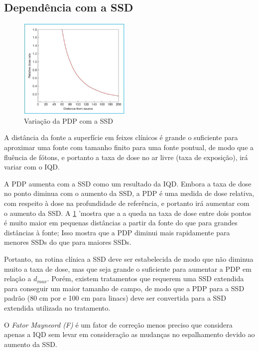 \documentclass[11pt,a4paper]{article}
\begin{document}
	\subsection{Dependência com a SSD}

	\begin{figure}
		\centering
		\includegraphics[width=0.48\textwidth]{Imagens/pdpSsd.JPG}
		\caption{Variação da PDP com a SSD}
		\label{fig:pdpSsd}
	\end{figure}

	A distância da fonte a superfície em feixes clínicos é grande o suficiente para aproximar uma fonte com tamanho finito para uma fonte pontual, de modo que a fluência de fótons, e portanto a taxa de dose no ar livre (taxa de exposição), irá variar com o IQD. 

	A PDP aumenta com a SSD como um resultado da IQD. Embora a taxa de dose no ponto diminua com o aumento da SSD, a PDP é uma medida de dose relativa, com respeito à dose na profundidade de referência, e portanto irá aumentar com o aumento da SSD. A \ref{fig:pdpSsd} 'mostra que a a queda na taxa de dose entre dois pontos é muito maior em pequenas distâncias a partir da fonte do que para grandes distâncias à fonte; Isso mostra que a PDP diminui mais rapidamente para menores SSDs do que para maiores SSDs. 

	Portanto, na rotina clínica a SSD deve ser estabelecida de modo que não diminua muito a taxa de dose, mas que seja grande o suficiente para aumentar a PDP em relação a $d_{max}$. Porém, existem tratamentos que requerem uma SSD extendida para conseguir um maior tamanho de campo, de modo que a PDP para a SSD padrão (80 cm por  e 100 cm para linacs) deve ser convertida para a SSD extendida utilizada no tratamento. 

	O \textit{\textcolor{CarnationPink}{Fator Mayneord (F)}} é um fator de correção menos preciso que considera apenas a IQD sem levar em consideração as mudanças no espalhamento devido ao aumento da SSD.
\end{document}
